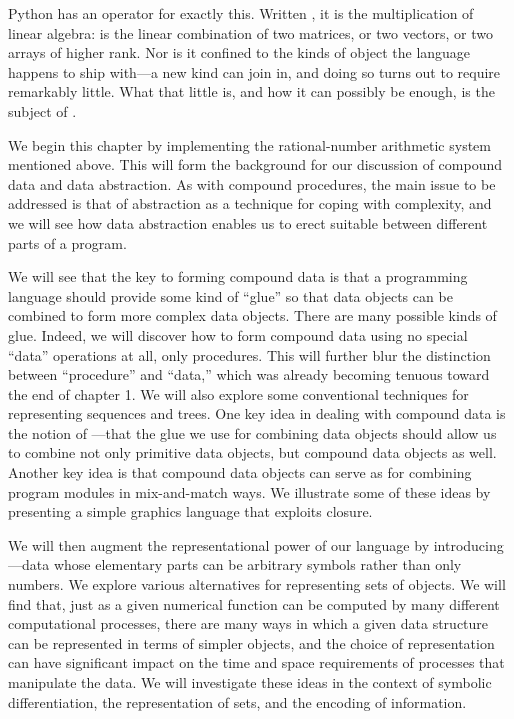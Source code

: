 Python has an operator for exactly this.  Written , it is the
multiplication of linear algebra:  is the linear
combination of two matrices, or two vectors, or two arrays of higher rank.  Nor
is it confined to the kinds of object the language happens to ship with---a new
kind can join in, and doing so turns out to require remarkably little.  What
that little is, and how it can possibly be enough, is the subject of
.

We begin this chapter by implementing the rational-number arithmetic system
mentioned above.  This will form the background for our discussion of compound
data and data abstraction.  As with compound procedures, the main issue to be
addressed is that of abstraction as a technique for coping with complexity, and
we will see how data abstraction enables us to erect suitable
 between different parts of a program.

We will see that the key to forming compound data is that a programming
language should provide some kind of ``glue'' so that data objects can be
combined to form more complex data objects.  There are many possible kinds of
glue.  Indeed, we will discover how to form compound data using no special
``data'' operations at all, only procedures.  This will further blur the
distinction between ``procedure'' and ``data,'' which was already becoming
tenuous toward the end of chapter 1.  We will also explore some
conventional techniques for representing sequences and trees.  One key idea in
dealing with compound data is the notion of ---that the glue
we use for combining data objects should allow us to combine not only primitive
data objects, but compound data objects as well.  Another key idea is that
compound data objects can serve as  for
combining program modules in mix-and-match ways.  We illustrate some of these
ideas by presenting a simple graphics language that exploits closure.

We will then augment the representational power of our language by introducing
---data whose elementary parts can be arbitrary
symbols rather than only numbers.  We explore various alternatives for
representing sets of objects.  We will find that, just as a given numerical
function can be computed by many different computational processes, there are
many ways in which a given data structure can be represented in terms of
simpler objects, and the choice of representation can have significant impact
on the time and space requirements of processes that manipulate the data.  We
will investigate these ideas in the context of symbolic differentiation, the
representation of sets, and the encoding of information.

